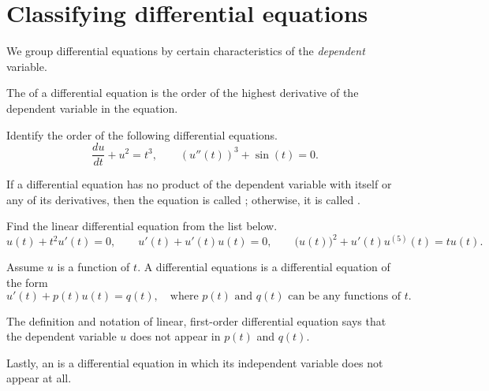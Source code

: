 \documentclass[../main.tex]{subfiles}
\begin{document}
 \section{Classifying differential equations}

We group differential equations by certain characteristics of the \emph{dependent} variable.

\begin{definition}[order]
The  of a differential equation is the order of the highest derivative of the dependent variable in the equation.
\end{definition}
\begin{example}
  Identify the order of the following differential equations.
  \[
    \frac{du}{dt} + u^{2} = t^{3}, 
    \qquad
    \left(u''(t)\right)^{3} + \sin(t) = 0.
  \]
\end{example}

\begin{definition}
  If a differential equation has no product of the dependent variable with itself or any of its derivatives, then the equation is called ; otherwise, it is called . 
\end{definition}
\begin{example}
  Find the linear differential equation from the list below.
  \[
    u(t) + t^{2} u'(t) = 0,
    \qquad
    u'(t) + u'(t) u(t) = 0,
    \qquad
    \big(u(t)\big)^{2} + u'(t) u^{(5)}(t) = t u(t).
  \]
\end{example}

\begin{definition}
  Assume \(u\) is a function of \(t\). A  differential equations is a differential equation of the form
  \[
    u'(t) + p(t) u(t) = q(t), \quad\text{where \(p(t)\) and \(q(t)\) can be any functions of \(t\)}.
  \]
\end{definition}

\faExclamationTriangle{} The definition and notation of linear, first-order differential equation says that the dependent variable \(u\) does not appear in \(p(t)\) and \(q(t)\).

\label{def:autonomous}
Lastly, an  is a differential equation in which its independent variable does not appear at all. 
\end{document}
